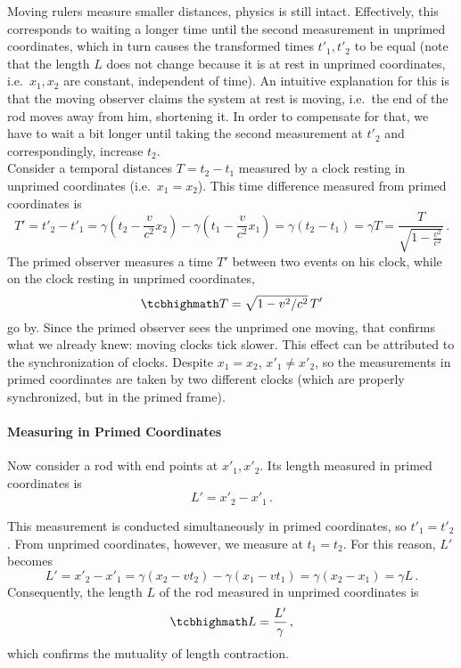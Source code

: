 Moving rulers measure smaller distances, physics is still intact.
Effectively, this corresponds to waiting a longer time until the second measurement in unprimed coordinates, which in turn causes the transformed times $t'_1, t'_2$ to be equal (note that the length $L$ does not change because it is at rest in unprimed coordinates, i.e.~$x_1, x_2$ are constant, independent of time). An intuitive explanation for this is that the moving observer claims the system at rest is moving, i.e.~the end of the rod moves away from him, shortening it. In order to compensate for that, we have to wait a bit longer until taking the second measurement at $t'_2$ and correspondingly, increase $t_2$.\\


Consider a temporal distances $T = t_2 - t_1$ measured by a clock resting in unprimed coordinates (i.e.~$x_1 = x_2$). This time difference measured from primed coordinates is
\begin{equation*}
	T' = t'_2 - t'_1 = \gamma (t_2 - \frac{v}{c^2} x_2) - \gamma (t_1 - \frac{v}{c^2} x_1) = \gamma (t_2 - t_1) = \gamma T = \frac{T}{\sqrt{1 - \frac{v^2}{c^2}}} \, .
\end{equation*}
The primed observer measures a time $T'$ between two events on his clock, while on the clock resting in unprimed coordinates,
\begin{equation}
	\eqbox{
	T = \sqrt{1 - v^2 / c^2} \, T'
	}
\end{equation}
go by. Since the primed observer sees the unprimed one moving, that confirms what we already knew: moving clocks tick slower. This effect can be attributed to the synchronization of clocks. Despite $x_1 = x_2$, $x'_1 \neq x'_2$, so the measurements in primed coordinates are taken by two different clocks (which are properly synchronized, but in the primed frame).



			\paragraph{Measuring in Primed Coordinates}
Now consider a rod with end points at $x'_1, x'_2$. Its length measured in primed coordinates is
\begin{equation*}\label{eq:rod_primed_coords_from_primed}
	L' = x'_2 - x'_1 \, .
\end{equation*}

This measurement is conducted simultaneously in primed coordinates, so $t'_1 = t'_2$. From unprimed coordinates, however, we measure at $t_1 = t_2$. For this reason, $L'$ becomes
\begin{equation*}
	L' = x'_2 - x'_1 = \gamma (x_2 - v t_2) - \gamma (x_1 - v t_1) = \gamma (x_2 - x_1) = \gamma L \, .
\end{equation*}
Consequently, the length $L$ of the rod measured in unprimed coordinates is
\begin{equation}
	\eqbox{
	L = \frac{L'}{\gamma}
	} \, ,
\end{equation}
which confirms the mutuality of length contraction.


